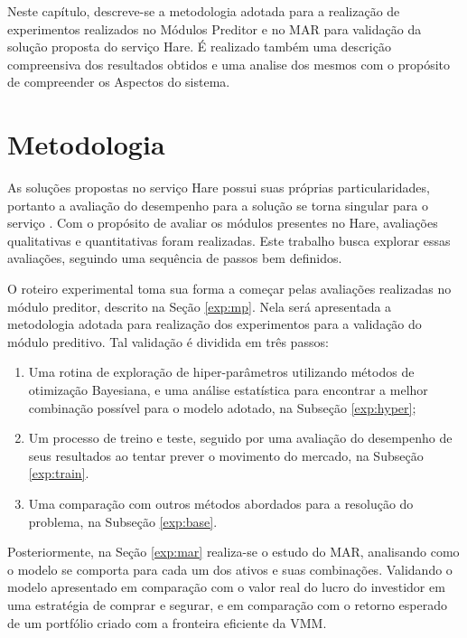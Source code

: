 Neste capítulo, descreve-se a metodologia adotada para a realização de experimentos realizados no Módulos Preditor e no \acrlong{MAR} para validação da solução proposta do serviço Hare. É realizado também uma descrição compreensiva dos resultados obtidos e uma analise dos mesmos com o propósito de compreender os Aspectos do sistema. 


\section{Metodologia}

As soluções propostas no serviço Hare possui suas próprias particularidades, portanto a avaliação do desempenho para a solução se torna singular para o serviço \cite{jain1990art}. Com o propósito de avaliar os módulos presentes no Hare, avaliações qualitativas e quantitativas foram realizadas. Este trabalho busca explorar essas avaliações, seguindo uma sequência de passos bem definidos.

O roteiro experimental toma sua forma a começar pelas avaliações realizadas no módulo preditor, descrito na Seção \ref{exp:mp}. Nela será apresentada a metodologia adotada para realização dos experimentos para a validação do módulo preditivo. Tal validação é dividida em três passos: 
\begin{enumerate}
    \item Uma rotina de exploração de hiper-parâmetros utilizando métodos de otimização Bayesiana, e uma análise estatística para encontrar a melhor combinação possível para o modelo adotado, na Subseção \ref{exp:hyper};
    \item Um processo de treino e teste, seguido por uma avaliação do desempenho de seus resultados ao tentar prever o movimento do mercado, na Subseção \ref{exp:train}.
    \item Uma comparação com outros métodos abordados para a resolução do problema, na Subseção \ref{exp:base}.
\end{enumerate}

Posteriormente, na Seção \ref{exp:mar} realiza-se o estudo do \acrfull{MAR}, analisando como o modelo se comporta para cada um dos ativos e suas combinações. Validando o modelo apresentado em comparação com o valor real do lucro do investidor em uma estratégia de comprar e segurar, e em comparação com o retorno esperado de um portfólio criado com a fronteira eficiente da \acrfull{VMM}.

